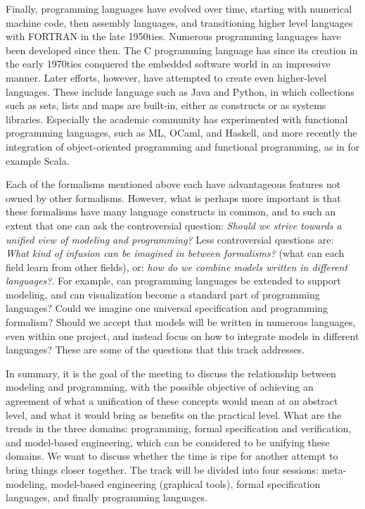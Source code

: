 Finally, programming languages have evolved over time, starting 
with numerical machine code, then assembly languages, and 
transitioning higher level languages with FORTRAN in the late 
1950ties. Numerous programming languages have been developed since 
then. The C programming language has  since its creation in the 
early 1970ties conquered the embedded software world in an 
impressive manner. Later efforts, however, have attempted to
create even higher-level languages. These include language such as
Java and Python, in which collections such as sets, lists and maps 
are built-in, either as constructs or as systems libraries. 
Especially the academic community has experimented with functional 
programming languages, such as ML, OCaml, and Haskell, and more 
recently the integration of object-oriented programming and 
functional programming, as in for example Scala.

Each of the formalisms mentioned above each have advantageous features not owned by other formalisms. However, what is perhaps more important is that these formalisms have many language constructs in common, and to  such an extent that one can ask the controversial question: 
{\em Should we strive towards a unified view of modeling and 
programming?} Less controversial questions are: 
{\em What kind of infusion can be imagined in between formalisms?} 
(what can each field learn from other fields),
or: {\em how do we combine models written in different languages?}. 
For example, can programming languages be extended to support 
modeling, and can visualization become a standard part of 
programming languages? Could we imagine one universal specification 
and programming formalism? Should we accept that models will be 
written in numerous languages, even within one project, and instead 
focus on how to integrate models in different languages?
These are some of the questions that this track addresses. 

In summary, it is the goal of the meeting to discuss the 
relationship between modeling and programming, with the possible 
objective of achieving an agreement of what a unification of these 
concepts would mean at an abstract level, and what it would bring 
as benefits on the practical level. What are the trends in the 
three domains: programming, formal specification and verification, 
and model-based engineering, which can be considered to be unifying 
these domains. We want to discuss whether the time is ripe for 
another attempt to bring things closer together. The track will be 
divided into four sessions: meta-modeling, model-based engineering 
(graphical tools), formal specification languages, and finally 
programming languages.